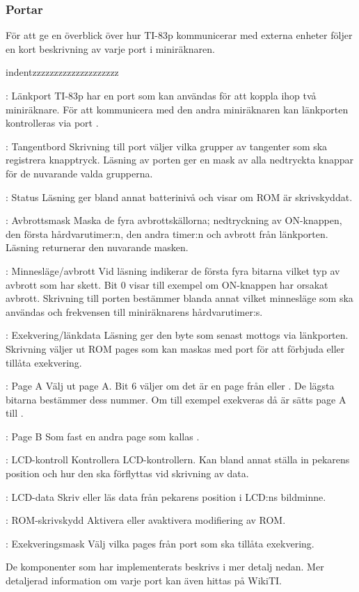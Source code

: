 \documentclass[main.tex]{subfiles}
\begin{document}
\subsubsection{Portar}
För att ge en överblick över hur TI-83p kommunicerar med externa enheter följer
en kort beskrivning av varje port i miniräknaren.

\begin{labeling}{indentzzzzzzzzzzzzzzzzzzzz}
\item[\mono{00}: Länkport]
    TI-83p har en port som kan användas för att koppla ihop två miniräknare.
    För att kommunicera med den andra miniräknaren kan länkporten kontrolleras
    via port .
\item[\mono{01}: Tangentbord]
    Skrivning till port  väljer vilka grupper av tangenter som ska
    registrera knapptryck. Läsning av porten ger en mask av alla nedtryckta
    knappar för de nuvarande valda grupperna.
\item[\mono{02}: Status]
    Läsning ger bland annat batterinivå och visar om ROM är skrivskyddat.
\item[\mono{03}: Avbrottsmask]
    Maska de fyra avbrottskällorna; nedtryckning av ON-knappen, den första
    hårdvarutimer:n, den andra timer:n och avbrott från länkporten. Läsning
    returnerar den nuvarande masken.
\item[\mono{04}: Minnesläge/avbrott]
    Vid läsning indikerar de första fyra bitarna vilket typ av avbrott som har
    skett. Bit 0 visar till exempel om ON-knappen har orsakat avbrott.
    Skrivning till porten bestämmer blanda annat vilket minnesläge som ska
    användas och frekvensen till miniräknarens hårdvarutimer:s.
\item[\mono{05}: Exekvering/länkdata]
    Läsning ger den byte som senast mottogs via länkporten. Skrivning väljer ut
    ROM pages som kan maskas med port  för att förbjuda eller tillåta
    exekvering.
\item[\mono{06}: Page A]
    Välj ut page A. Bit 6 väljer om det är en page från  eller
    . De lägsta bitarna bestämmer dess nummer. Om till exempel
     exekveras då  är  sätts page A till
    . 
\item[\mono{07}: Page B]
    Som  fast en andra page som kallas .
\item[\mono{10}: LCD-kontroll]
    Kontrollera LCD-kontrollern. Kan bland annat ställa in pekarens position
    och hur den ska förflyttas vid skrivning av data.
\item[\mono{11}: LCD-data]
    Skriv eller läs data från pekarens position i LCD:ns bildminne.
\item[\mono{14}: ROM-skrivskydd]
    Aktivera eller avaktivera modifiering av ROM.
\item[\mono{16}: Exekveringsmask]
    Välj vilka pages från port  som ska tillåta exekvering.
\end{labeling}
De komponenter som har implementerats beskrivs i mer detalj nedan. Mer
detaljerad information om varje port kan även hittas på
WikiTI\cite{wikiti-ports}.
\end{document}
